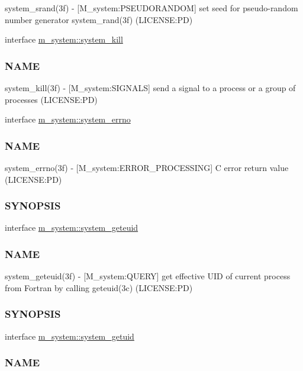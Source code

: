 \begin{DoxyCompactItemize}
\begin{DoxyCompactList}
system\+\_\+srand(3f) -\/ \mbox{[}M\+\_\+system\+:P\+S\+E\+U\+D\+O\+R\+A\+N\+D\+OM\mbox{]} set seed for pseudo-\/random number generator system\+\_\+rand(3f) (L\+I\+C\+E\+N\+SE\+:PD) \end{DoxyCompactList}\item 
interface \mbox{\hyperlink{interfacem__system_1_1system__kill}{m\+\_\+system\+::system\+\_\+kill}}
\begin{DoxyCompactList}\small\item\em \subsubsection*{N\+A\+ME}

system\+\_\+kill(3f) -\/ \mbox{[}M\+\_\+system\+:S\+I\+G\+N\+A\+LS\mbox{]} send a signal to a process or a group of processes (L\+I\+C\+E\+N\+SE\+:PD) \end{DoxyCompactList}\item 
interface \mbox{\hyperlink{interfacem__system_1_1system__errno}{m\+\_\+system\+::system\+\_\+errno}}
\begin{DoxyCompactList}\small\item\em \subsubsection*{N\+A\+ME}

system\+\_\+errno(3f) -\/ \mbox{[}M\+\_\+system\+:E\+R\+R\+O\+R\+\_\+\+P\+R\+O\+C\+E\+S\+S\+I\+NG\mbox{]} C error return value (L\+I\+C\+E\+N\+SE\+:PD) \subsubsection*{S\+Y\+N\+O\+P\+S\+IS}\end{DoxyCompactList}\item 
interface \mbox{\hyperlink{interfacem__system_1_1system__geteuid}{m\+\_\+system\+::system\+\_\+geteuid}}
\begin{DoxyCompactList}\small\item\em \subsubsection*{N\+A\+ME}

system\+\_\+geteuid(3f) -\/ \mbox{[}M\+\_\+system\+:Q\+U\+E\+RY\mbox{]} get effective U\+ID of current process from Fortran by calling geteuid(3c) (L\+I\+C\+E\+N\+SE\+:PD) \subsubsection*{S\+Y\+N\+O\+P\+S\+IS}\end{DoxyCompactList}\item 
interface \mbox{\hyperlink{interfacem__system_1_1system__getuid}{m\+\_\+system\+::system\+\_\+getuid}}
\begin{DoxyCompactList}\small\item\em \subsubsection*{N\+A\+ME}


\end{DoxyCompactList}
\end{DoxyCompactItemize}
